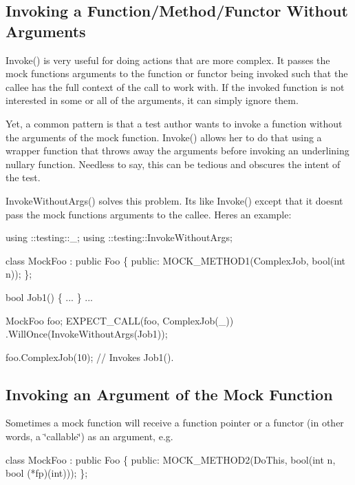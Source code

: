 \subsection*{Invoking a Function/\+Method/\+Functor Without Arguments}

{\ttfamily Invoke()} is very useful for doing actions that are more complex. It passes the mock function\textquotesingle{}s arguments to the function or functor being invoked such that the callee has the full context of the call to work with. If the invoked function is not interested in some or all of the arguments, it can simply ignore them.

Yet, a common pattern is that a test author wants to invoke a function without the arguments of the mock function. {\ttfamily Invoke()} allows her to do that using a wrapper function that throws away the arguments before invoking an underlining nullary function. Needless to say, this can be tedious and obscures the intent of the test.

{\ttfamily Invoke\+Without\+Args()} solves this problem. It\textquotesingle{}s like {\ttfamily Invoke()} except that it doesn\textquotesingle{}t pass the mock function\textquotesingle{}s arguments to the callee. Here\textquotesingle{}s an example\+:


\begin{DoxyCode}
using ::testing::\_;
using ::testing::InvokeWithoutArgs;

\textcolor{keyword}{class }MockFoo : \textcolor{keyword}{public} Foo \{
 \textcolor{keyword}{public}:
  MOCK\_METHOD1(ComplexJob, \textcolor{keywordtype}{bool}(\textcolor{keywordtype}{int} n));
\};

\textcolor{keywordtype}{bool} Job1() \{ ... \}
...

  MockFoo foo;
  EXPECT\_CALL(foo, ComplexJob(\_))
      .WillOnce(InvokeWithoutArgs(Job1));

  foo.ComplexJob(10);  \textcolor{comment}{// Invokes Job1().}
\end{DoxyCode}


\subsection*{Invoking an Argument of the Mock Function}

Sometimes a mock function will receive a function pointer or a functor (in other words, a \char`\"{}callable\char`\"{}) as an argument, e.\+g.


\begin{DoxyCode}
\textcolor{keyword}{class }MockFoo : \textcolor{keyword}{public} Foo \{
 \textcolor{keyword}{public}:
  MOCK\_METHOD2(DoThis, \textcolor{keywordtype}{bool}(\textcolor{keywordtype}{int} n, \textcolor{keywordtype}{bool} (*fp)(\textcolor{keywordtype}{int})));
\};
\end{DoxyCode}


